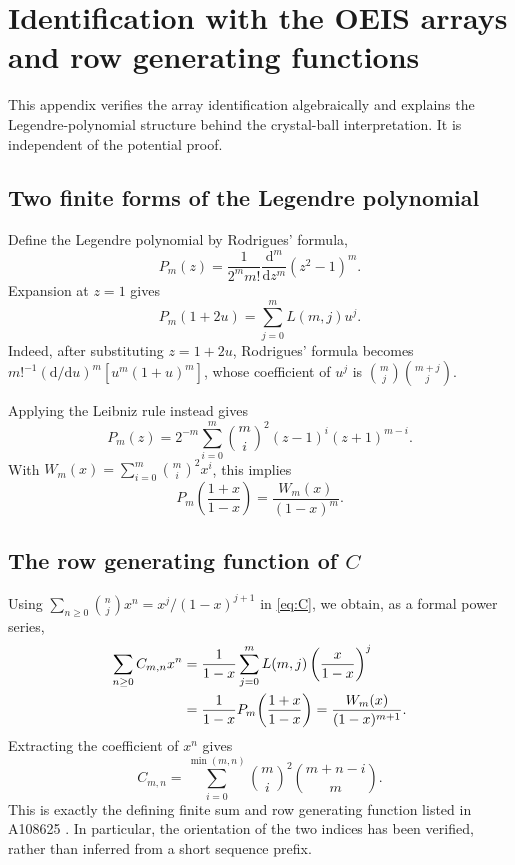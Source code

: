 \documentclass[11pt,letterpaper]{article}
\numberwithin{equation}{section}
\theoremstyle{definition}
\newcommand{\dd}{\mathrm d}
\begin{document}
\section{Identification with the OEIS arrays and row generating functions}\label{app:identification}

This appendix verifies the array identification algebraically and
explains the Legendre-polynomial structure behind the crystal-ball
interpretation. It is independent of the potential proof.

\subsection{Two finite forms of the Legendre polynomial}

Define the Legendre polynomial by Rodrigues' formula,
\[
 P_m(z)=\frac1{2^m m!}\frac{\dd^m}{\dd z^m}(z^2-1)^m.
\]
Expansion at $z=1$ gives
\begin{equation}\label{eq:LegendreL}
 P_m(1+2u)=\sum_{j=0}^{m}L(m,j)u^j.
\end{equation}
Indeed, after substituting $z=1+2u$, Rodrigues' formula becomes
$m!^{-1}(\dd/\dd u)^m[u^m(1+u)^m]$, whose coefficient of $u^j$ is
$\binom mj\binom{m+j}{j}$.

Applying the Leibniz rule instead gives
\begin{equation}\label{eq:LegendreW}
 P_m(z)=2^{-m}\sum_{i=0}^{m}\binom mi^2
 (z-1)^i(z+1)^{m-i}.
\end{equation}
With $W_m(x)=\sum_{i=0}^{m}\binom mi^2x^i$, this implies
\begin{equation}\label{eq:Psub}
 P_m\!\left(\frac{1+x}{1-x}\right)=\frac{W_m(x)}{(1-x)^m}.
\end{equation}

\subsection{The row generating function of \texorpdfstring{$C$}{C}}

Using $\sum_{n\geq0}\binom njx^n=x^j/(1-x)^{j+1}$ in
\eqref{eq:C}, we obtain, as a formal power series,
\begin{align}
 \sum_{n\geq0}C_{m,n}x^n
 &=\frac1{1-x}\sum_{j=0}^{m}L(m,j)
       \left(\frac{x}{1-x}\right)^j\notag\\
 &=\frac1{1-x}P_m\!\left(\frac{1+x}{1-x}\right)
 =\frac{W_m(x)}{(1-x)^{m+1}}.\label{eq:Cgf}
\end{align}
Extracting the coefficient of $x^n$ gives
\begin{equation}\label{eq:Calternative}
 C_{m,n}=\sum_{i=0}^{\min(m,n)}\binom mi^2\binom{m+n-i}{m}.
\end{equation}
This is exactly the defining finite sum and row generating function
listed in A108625 \cite{oeis108625}. In particular, the orientation of
the two indices has been verified, rather than inferred from a short
sequence prefix.
\end{document}
